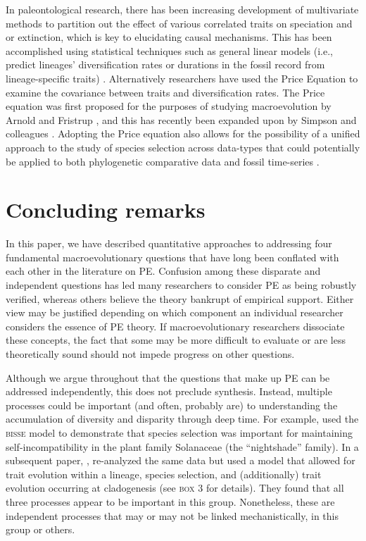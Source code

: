 In paleontological research, there has been increasing development of multivariate methods to partition out the effect of various correlated traits on speciation and or extinction, which is key to elucidating causal mechanisms. This has been accomplished using statistical techniques such as general linear models (i.e., predict lineages' diversification rates or durations in the fossil record from lineage-specific traits) \citep{JablonskiHunt2006, Harnik2011, Harnik2012}. Alternatively researchers have used the Price Equation \citep{Price1972, Rice2004, Okasha2006, Frank2012} to examine the covariance between traits and diversification rates. The Price equation was first proposed for the purposes of studying macroevolution by Arnold and Fristrup \citep{ArnoldFristrup1982}, and this has recently been expanded upon by Simpson and colleagues \citep{SimpsonHarnik2009, Simpson2010}. Adopting the Price equation also allows for the possibility of a unified approach to the study of species selection across data-types that could potentially be applied to both phylogenetic comparative data and fossil time-series \citep{Jablonski2008,Simpson2013}. 

\section{Concluding remarks}

In this paper, we have described quantitative approaches to addressing four fundamental macroevolutionary questions that have long been conflated with each other in the literature on PE. Confusion among these disparate and independent questions has led many researchers to consider PE as being robustly verified, whereas others believe the theory bankrupt of empirical support. Either view may be justified depending on which component an individual researcher considers the essence of PE theory. If macroevolutionary researchers dissociate these concepts, the fact that some may be more difficult to evaluate or are less theoretically sound should not impede progress on other questions.

Although we argue throughout that the questions that make up PE can be addressed independently, this does not preclude synthesis. Instead, multiple processes could be important (and often, probably are) to understanding the accumulation of diversity and disparity through deep time. For example, \citet{Goldberg2010} used the \textsc{bisse} model to demonstrate that species selection was important for maintaining self-incompatibility in the plant family Solanaceae (the ``nightshade'' family). In a subsequent paper, \citet{Goldberg2012}, re-analyzed the same data but used a model that allowed for trait evolution within a lineage, species selection, and (additionally) trait evolution occurring at cladogenesis (see \textsc{box 3} for details). They found that all three processes appear to be important in this group. Nonetheless, these are independent processes that may or may not be linked mechanistically, in this group or others.

